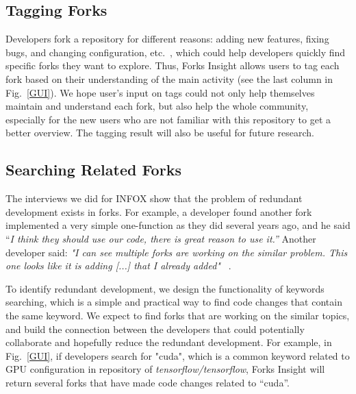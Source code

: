 \subsection{Tagging Forks}
%
Developers fork a repository for different reasons: adding new features, fixing bugs, and changing configuration, etc.~\cite{Mikkonen2011,Robles2012,dubinsky2013exploratory,stanciulescu2015forked}, which could help developers quickly find specific forks they want to explore. Thus, Forks Insight allows users to tag each fork based on their understanding of the main activity (see the last column in Fig.~\ref{GUI}). We hope user's input on tags could not only help themselves maintain and understand each fork, but also help the whole community, especially for the new users who are not familiar with this repository to get a better overview. The tagging result will also be useful for future research.


\subsection{Searching Related Forks}

The interviews we did for INFOX show that the problem of redundant development exists in forks. For example, a developer found another fork implemented a very simple one-function as they did several years ago, and he said ``\emph{I think they should use our code, there is great reason to use it.''} Another developer said: \emph{"I can see multiple forks are working on the similar problem. This one looks like it is adding [...] that I already added"} ~\cite{ZSLXWK:ICSE18}.

To identify redundant development, we design the functionality of keywords searching, which is a simple and practical way to find code changes that contain the same keyword. We expect to find forks that are working on the similar topics, and build the connection between the developers that could potentially collaborate and hopefully reduce the redundant development. For example, in Fig.~\ref{GUI}, if developers search for "cuda", which is a common keyword related to GPU configuration in repository of \emph{tensorflow/tensorflow}, Forks Insight will return several forks that have made code changes related to ``cuda''. 
\iffalse
\begin{figure}[H] 
\centering
\texttt{[image: shot2.png]}
\caption{An example of searching for similar forks.}
\vspace{-10pt}

\end{figure}
\fi

